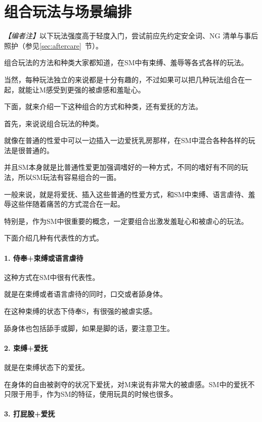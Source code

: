\documentclass[12pt,UTF8]{ctexbook}
\begin{document}
\section{组合玩法与场景编排}

\noindent\textit{【编者注】}以下玩法强度高于轻度入门，尝试前应先约定安全词、NG 清单与事后照护（参见\ref{sec:aftercare}~节）。

组合玩法的方法和种类大家都知道，在SM中有束缚、羞辱等各式各样的玩法。

当然，每种玩法独立的来说都是十分有趣的，不过如果可以把几种玩法组合在一起，就能让M感受到更强的被虐感和羞耻心。

下面，就来介绍一下这种组合的方式和种类，还有爱抚的方法。

首先，来说说组合玩法的种类。

就像在普通的性爱中可以一边插入一边爱抚乳房那样，在SM中混合各种各样的玩法是很普通的。

并且SM本身就是比普通性爱更加强调嗜好的一种方式，不同的嗜好有不同的玩法，所以SM玩法有容易组合的一面。

一般来说，就是将爱抚、插入这些普通的性爱方式，和SM中束缚、语言虐待、羞辱这些伴随着痛苦的方式混合在一起。

特别是，作为SM中很重要的概念，一定要组合出激发羞耻心和被虐心的玩法。

下面介绍几种有代表性的方式。

\paragraph{1. 侍奉+束缚或语言虐待}

这种方式在SM中很有代表性。

就是在束缚或者语言虐待的同时，口交或者舔身体。

在这种束缚的状态下侍奉S，有很强的被虐实感。

舔身体也包括舔手或脚，如果是脚的话，要注意卫生。

\paragraph{2. 束缚+爱抚}

就是在束缚状态下的爱抚。

在身体的自由被剥夺的状况下爱抚，对M来说有非常大的被虐感。SM中的爱抚不只限于用手，作为SM的特征，使用玩具的时候也很多。

\paragraph{3. 打屁股+爱抚}
\end{document}
